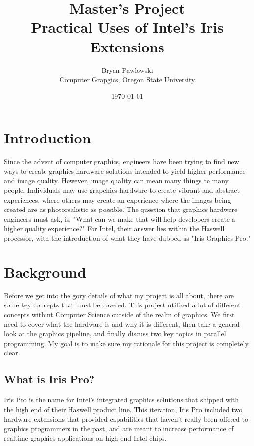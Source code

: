 \documentclass[a4paper, 12pt]{article}
\title{Master's Project \\ Practical Uses of Intel's 
Iris Extensions}
\date{\today}
\author{Bryan Pawlowski \\ Computer Grapgics, Oregon State University}
\begin{document}
\maketitle

\pagebreak

\tableofcontents

\pagebreak

\section{Introduction} 

Since the advent of computer graphics, engineers have been trying to find new
ways to create graphics hardware solutions intended to yield higher
performance and image quality. However, image quality can mean many things to
many people. Individuals may use grapchics hardware to create vibrant and
abstract experiences, where others may create an experience where the images
being created are as photorealistic as possible. The question that graphics
hardware engineers must ask, is, "What can we make that will help developers
create a higher quality experience?" For Intel, their answer lies within the
Haswell processor, with the introduction of what they have dubbed as "Iris
Graphics Pro."


\section{Background}

Before we get into the gory details of what my project is all about, there are
some key concepts that must be covered. This project utilized a lot of
different concepts withint Computer Science outside of the realm of graphics.
We first need to cover what the hardware is and why it is different, then take
a general look at the graphics pipeline, and finally discuss two key topics in
parallel programming. My goal is to make sure my rationale for this project is
completely clear.

\subsection{What is Iris Pro?}

Iris Pro is the name for Intel's integrated graphics solutions that shipped
with the high end of their Haswell product line. This iteration, Iris Pro
included two hardware extensions that provided capabilities that haven't
really been offered to graphics programmers in the past, and are meant to
increase performance of realtime graphics applications on high-end Intel
chips.
\end{document}
